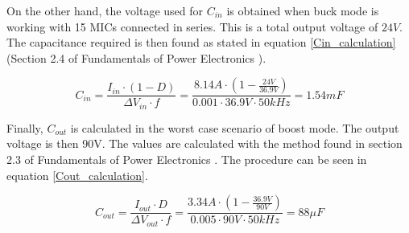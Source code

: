 On the other hand, the voltage used for $C_{in}$ is obtained when buck mode is working with 15 MICs connected in series. This is a total output voltage of $24 V$.
The capacitance required is then found as stated in equation \ref{Cin_calculation} (Section 2.4 of Fundamentals of Power Electronics \cite{Erickson}).

\begin{equation} \label{Cin_calculation}
C_{in} = \frac{I_{in} \cdot (1 - D)}{\Delta V_{in} \cdot f} = \frac{8.14 A \cdot ( 1 - \frac{24 V}{36.9 V})}{0.001 \cdot 36.9 V \cdot 50 kHz} = 1.54 mF
\end{equation}

Finally, $C_{out}$ is calculated in the worst case scenario of boost mode. The output voltage is then 90V. The values are calculated with the method found in section 2.3 of Fundamentals of Power Electronics \cite{Erickson}. The procedure can be seen in equation \ref{Cout_calculation}.

\begin{equation} \label{Cout_calculation}
C_{out} = \frac{I_{out} \cdot D}{\Delta V_{out} \cdot f} = \frac{3.34 A \cdot ( 1 - \frac{36.9 V}{90 V})}{0.005 \cdot 90 V \cdot 50 kHz} = 88 \mu F
\end{equation}
   
